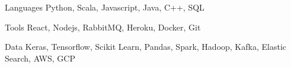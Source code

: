


\begin{cvskills}


\cvskill
{Languages} %
{Python, Scala, Javascript, Java, C++, SQL} %


\cvskill
{Tools}
{React, Nodejs, RabbitMQ, Heroku, Docker, Git}


\cvskill
{Data}
{Keras, Tensorflow, Scikit Learn, Pandas, Spark, Hadoop, Kafka, Elastic Search, AWS, GCP}





\end{cvskills}

